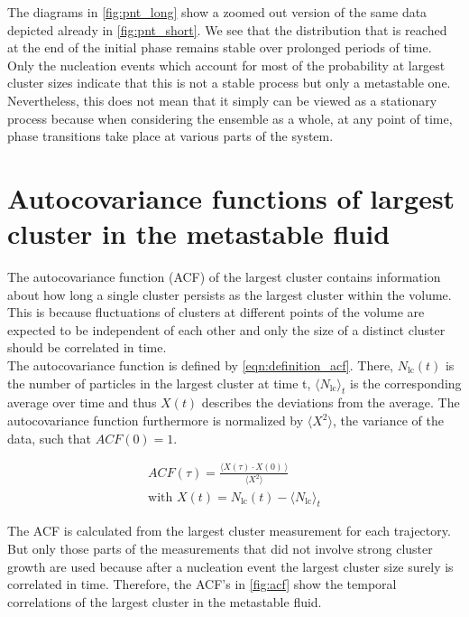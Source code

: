 The diagrams in \autoref{fig:pnt_long} show a zoomed out version of the same data depicted already in \autoref{fig:pnt_short}. We see that the distribution that is reached at the end of the initial phase remains stable over prolonged periods of time. Only the nucleation events which account for most of the probability at largest cluster sizes indicate that this is not a stable process but only a metastable one. Nevertheless, this does not mean that it simply can be viewed as a stationary process because when considering the ensemble as a whole, at any point of time, phase transitions take place at various parts of the system.

\section{Autocovariance functions of largest cluster in the metastable fluid}
\label{sec:acf}
The autocovariance function (ACF) of the largest cluster contains information about how long a single cluster persists as the largest cluster within the volume. This is because fluctuations of clusters at different points of the volume are expected to be independent of each other and only the size of a distinct cluster should be correlated in time.\\

The autocovariance function is defined by \autoref{eqn:definition_acf}. There, $N_{\text{lc}}(t)$ is the number of particles in the largest cluster at time t, $\langle N_{\text{lc}} \rangle_t$ is the corresponding average over time and thus $X(t)$ describes the deviations from the average. The autocovariance function furthermore is normalized by ${ \langle X^2  \rangle }$, the variance of the data, such that $ACF(0) = 1 $.

\begin{align}
\label{eqn:definition_acf} 
ACF(\tau)=\frac{ \langle  X(\tau) \cdot  X(0) \! \: \rangle }{ \langle X^2  \rangle }\\  
\text{with } X(t)=N_{\text{lc}}(t)- \langle N_{\text{lc}} \rangle_t 
\end{align}

The ACF is calculated from the largest cluster measurement for each trajectory. But only those parts of the measurements that did not involve strong cluster growth are used because after a nucleation event the largest cluster size surely is correlated in time. Therefore, the ACF's in \autoref{fig:acf} show the temporal correlations of the largest cluster in the metastable fluid.\\

